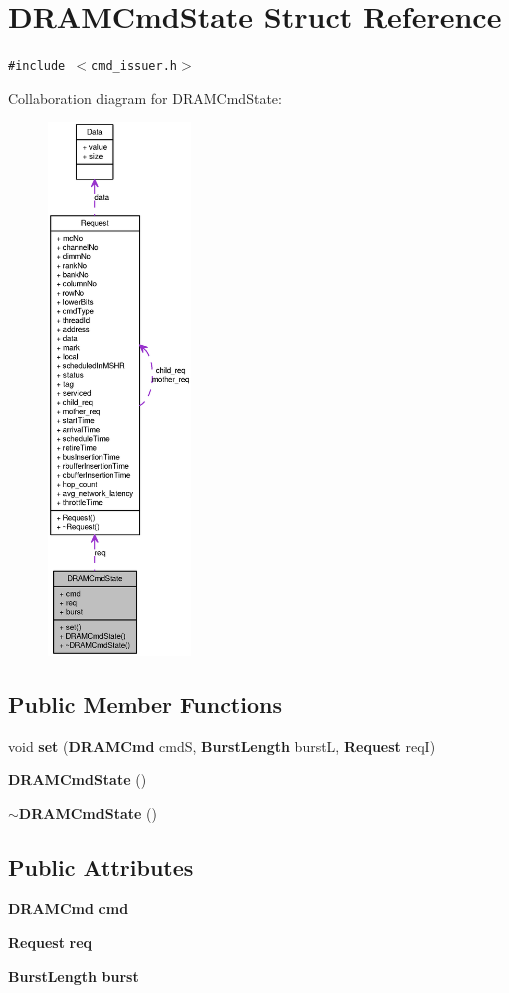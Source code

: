 \section{DRAMCmdState Struct Reference}
\label{structDRAMCmdState}
{\tt \#include $<$cmd\_\-issuer.h$>$}

Collaboration diagram for DRAMCmdState:\nopagebreak
\begin{figure}[H]
\begin{center}
\leavevmode
\includegraphics[height=400pt]{structDRAMCmdState__coll__graph}
\end{center}
\end{figure}
\subsection*{Public Member Functions}
\begin{CompactItemize}
\item 
void {\bf set} ({\bf DRAMCmd} cmdS, {\bf BurstLength} burstL, {\bf Request} reqI)
\item 
{\bf DRAMCmdState} ()
\item 
{\bf $\sim$DRAMCmdState} ()
\end{CompactItemize}
\subsection*{Public Attributes}
\begin{CompactItemize}
\item 
{\bf DRAMCmd} {\bf cmd}
\item 
{\bf Request} {\bf req}
\item 
{\bf BurstLength} {\bf burst}
\end{CompactItemize}


